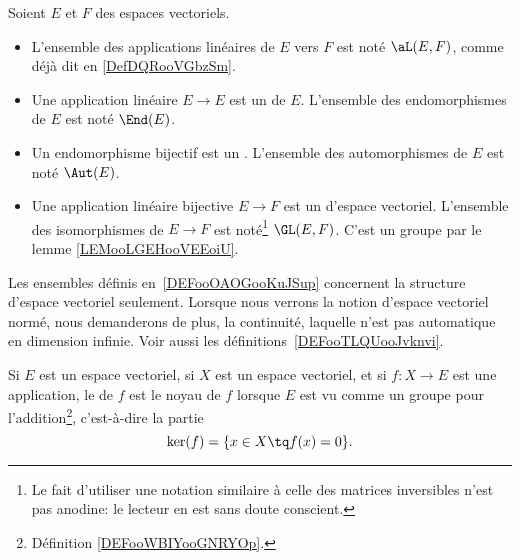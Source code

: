 \begin{definition}       \label{DEFooOAOGooKuJSup}
	Soient \( E\) et \( F\) des espaces vectoriels.
	\begin{itemize}
		\item
		      L'ensemble des applications linéaires de \( E\) vers \( F\) est noté \( \aL(E,F)\), comme déjà dit en \ref{DefDQRooVGbzSm}.
		\item Une application linéaire \( E\to E\) est un  de \( E\). L'ensemble des endomorphismes de \( E\) est noté \( \End(E)\).
		\item Un endomorphisme bijectif est un . L'ensemble des automorphismes de \( E\) est noté \( \Aut(E)\).
		\item
		      Une application linéaire bijective \( E\to F\) est un  d'espace vectoriel. L'ensemble des isomorphismes de \( E\to F\) est noté\footnote{Le fait d'utiliser une notation similaire à celle des matrices inversibles n'est pas anodine: le lecteur en est sans doute conscient.} \( \GL(E,F)\). C'est un groupe par le lemme \ref{LEMooLGEHooVEEoiU}.
	\end{itemize}
\end{definition}

\begin{remark}
	Les ensembles définis en~\ref{DEFooOAOGooKuJSup} concernent la structure d'espace vectoriel seulement. Lorsque nous verrons la notion d'espace vectoriel normé, nous demanderons de plus, la continuité, laquelle n'est pas automatique en dimension infinie. Voir aussi les définitions~\ref{DEFooTLQUooJvknvi}.
\end{remark}

\begin{definition}
	Si \( E\) est un espace vectoriel, si \( X\) est un espace vectoriel, et si \( f\colon X\to E\) est une application, le  de \( f\) est le noyau de \( f\) lorsque \( E\) est vu comme un groupe pour l'addition\footnote{Définition \ref{DEFooWBIYooGNRYOp}.}, c'est-à-dire la partie
	\begin{equation}
		\ker(f)=\{ x\in X\tq f(x)=0 \}.
	\end{equation}
\end{definition}

